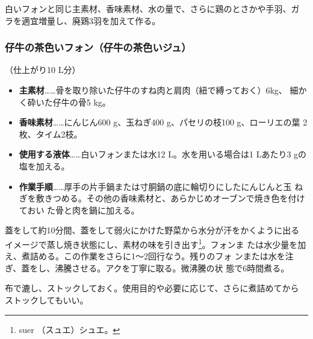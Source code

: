 \begin{recette}


白いフォンと同じ主素材、香味素材、水の量で、さらに鶏のとさかや手羽、ガ
ラを適宜増量し、廃鶏3羽を加えて作る。

\maeaki

\hypertarget{jus-de-veau-brun}{%
\subsubsection{仔牛の茶色いフォン（仔牛の茶色いジュ）}\label{jus-de-veau-brun}}



（仕上がり10 L分）

\begin{itemize}
\item
  \textbf{主素材}\ldots{}\ldots{}骨を取り除いた仔牛のすね肉と肩肉（紐で縛っておく）6kg、
  細かく砕いた仔牛の骨5 kg。
\item
  \textbf{香味素材}\ldots{}\ldots{}にんじん600 g、玉ねぎ400
  g、パセリの枝100 g、ローリエの葉 2枚、タイム2枝。
\item
  \textbf{使用する液体}\ldots{}\ldots{}白いフォンまたは水12
  L。水を用いる場合は1 Lあたり3 gの塩を加える。
\item
  \textbf{作業手順}\ldots{}\ldots{}厚手の片手鍋または寸胴鍋の底に輪切りにしたにんじんと玉
  ねぎを敷きつめる。その他の香味素材と、あらかじめオーブンで焼き色を付けておい
  た骨と肉を鍋に加える。
\end{itemize}

蓋をして約10分間、蓋をして弱火にかけた野菜から水分が汗をかくように出る
イメージで蒸し焼き状態にし、素材の味を引き出す\footnote{suer
  （スュエ）シュエ。}。フォンま
たは水少量を加え、煮詰める。この作業をさらに1〜2回行なう。残りのフォ
ンまたは水を注ぎ、蓋をし、沸騰させる。アクを丁寧に取る。微沸騰の状
態で6時間煮る。

布で漉し、ストックしておく。使用目的や必要に応じて、さらに煮詰めてから
ストックしてもいい。


\end{recette}
